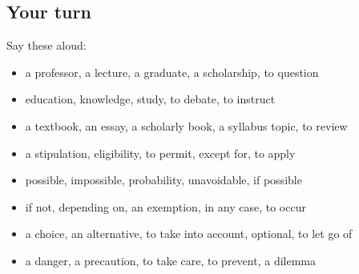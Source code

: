 \subsection*{Your turn}
Say these aloud:

\begin{itemize}
\raggedright
  \item a professor, a lecture, a graduate, a scholarship, to question
  \item education, knowledge, study, to debate, to instruct
  \item a textbook, an essay, a scholarly book, a syllabus topic, to review
  \item a stipulation, eligibility, to permit, except for, to apply
  \item possible, impossible, probability, unavoidable, if possible
  \item if not, depending on, an exemption, in any case, to occur
  \item a choice, an alternative, to take into account, optional, to let go of
  \item a danger, a precaution, to take care, to prevent, a dilemma
\end{itemize}

